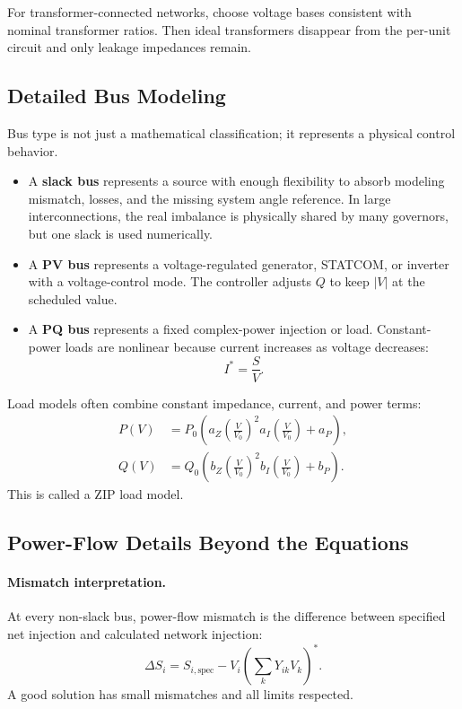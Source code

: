 \documentclass[11pt]{article}
\begin{document}
\begin{tcolorbox}[colback=blue!4,colframe=blue!50!black,title=Per-Unit Study Tip]
For transformer-connected networks, choose voltage bases consistent with
nominal transformer ratios. Then ideal transformers disappear from the per-unit
circuit and only leakage impedances remain.
\end{tcolorbox}

\subsection{Detailed Bus Modeling}
Bus type is not just a mathematical classification; it represents a physical
control behavior.
\begin{itemize}
  \item A \textbf{slack bus} represents a source with enough flexibility to
  absorb modeling mismatch, losses, and the missing system angle reference.
  In large interconnections, the real imbalance is physically shared by many
  governors, but one slack is used numerically.
  \item A \textbf{PV bus} represents a voltage-regulated generator, STATCOM, or
  inverter with a voltage-control mode. The controller adjusts $Q$ to keep
  $|V|$ at the scheduled value.
  \item A \textbf{PQ bus} represents a fixed complex-power injection or load.
  Constant-power loads are nonlinear because current increases as voltage
  decreases:
  \begin{equation}
  I^*=\frac{S}{V}.
  \end{equation}
\end{itemize}
Load models often combine constant impedance, current, and power terms:
\begin{align}
P(V)&=P_0\left(a_Z\left(\frac{V}{V_0}\right)^2
a_I\left(\frac{V}{V_0}\right)+a_P\right),\\
Q(V)&=Q_0\left(b_Z\left(\frac{V}{V_0}\right)^2
b_I\left(\frac{V}{V_0}\right)+b_P\right).
\end{align}
This is called a ZIP load model.

\subsection{Power-Flow Details Beyond the Equations}
\paragraph{Mismatch interpretation.}
At every non-slack bus, power-flow mismatch is the difference between specified
net injection and calculated network injection:
\begin{equation}
\Delta S_i=S_{i,\mathrm{spec}}-V_i\left(\sum_kY_{ik}V_k\right)^*.
\end{equation}
A good solution has small mismatches and all limits respected.
\end{document}
